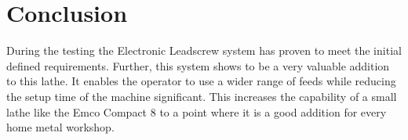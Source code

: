 \section{Conclusion}
During the testing the Electronic Leadscrew system has proven to meet the initial defined requirements. Further, this system shows to be a very valuable addition to this lathe. It enables the operator to use a wider range of feeds while reducing the setup time of the machine significant. This increases the capability of a small lathe like the Emco Compact 8 to a point where it is a good addition for every home metal workshop. 
